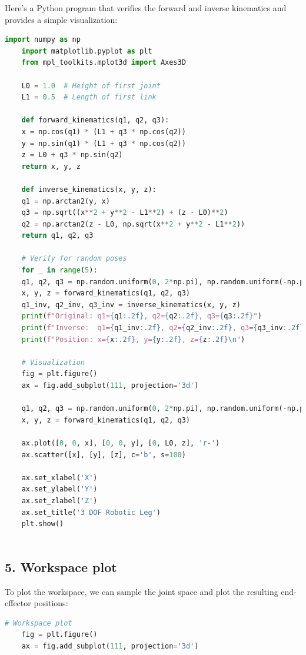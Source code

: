 \begin{solution}
	Here's a Python program that verifies the forward and inverse kinematics and provides a simple visualization:
	
	\begin{lstlisting}[language=Python]
	import numpy as np
	import matplotlib.pyplot as plt
	from mpl_toolkits.mplot3d import Axes3D
	
	L0 = 1.0  # Height of first joint
	L1 = 0.5  # Length of first link
	
	def forward_kinematics(q1, q2, q3):
	x = np.cos(q1) * (L1 + q3 * np.cos(q2))
	y = np.sin(q1) * (L1 + q3 * np.cos(q2))
	z = L0 + q3 * np.sin(q2)
	return x, y, z
	
	def inverse_kinematics(x, y, z):
	q1 = np.arctan2(y, x)
	q3 = np.sqrt((x**2 + y**2 - L1**2) + (z - L0)**2)
	q2 = np.arctan2(z - L0, np.sqrt(x**2 + y**2 - L1**2))
	return q1, q2, q3
	
	# Verify for random poses
	for _ in range(5):
	q1, q2, q3 = np.random.uniform(0, 2*np.pi), np.random.uniform(-np.pi/2, np.pi/2), np.random.uniform(0, 1)
	x, y, z = forward_kinematics(q1, q2, q3)
	q1_inv, q2_inv, q3_inv = inverse_kinematics(x, y, z)
	print(f"Original: q1={q1:.2f}, q2={q2:.2f}, q3={q3:.2f}")
	print(f"Inverse:  q1={q1_inv:.2f}, q2={q2_inv:.2f}, q3={q3_inv:.2f}")
	print(f"Position: x={x:.2f}, y={y:.2f}, z={z:.2f}\n")
	
	# Visualization
	fig = plt.figure()
	ax = fig.add_subplot(111, projection='3d')
	
	q1, q2, q3 = np.random.uniform(0, 2*np.pi), np.random.uniform(-np.pi/2, np.pi/2), np.random.uniform(0, 1)
	x, y, z = forward_kinematics(q1, q2, q3)
	
	ax.plot([0, 0, x], [0, 0, y], [0, L0, z], 'r-')
	ax.scatter([x], [y], [z], c='b', s=100)
	
	ax.set_xlabel('X')
	ax.set_ylabel('Y')
	ax.set_zlabel('Z')
	ax.set_title('3 DOF Robotic Leg')
	plt.show()
	
	\end{lstlisting}
	
	\subsection*{5. Workspace plot}
	
	To plot the workspace, we can sample the joint space and plot the resulting end-effector positions:
	
	\begin{lstlisting}[language=Python]
	# Workspace plot
	fig = plt.figure()
	ax = fig.add_subplot(111, projection='3d')
	

\end{lstlisting}
\end{solution}
